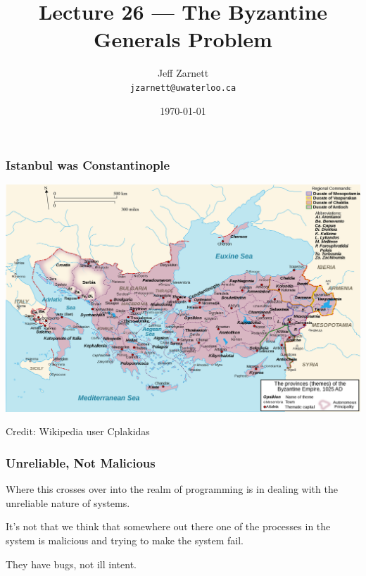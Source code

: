 

\title{Lecture 26 --- The Byzantine Generals Problem }

\author{Jeff Zarnett \\ \small \texttt{jzarnett@uwaterloo.ca}}
\date{\today}




\begin{frame}
	\titlepage

\end{frame}


\begin{frame}
	\frametitle{Istanbul was Constantinople}

	\begin{center}
		\includegraphics[width=\textwidth]{images/byzantium}
	\end{center}

	Credit: Wikipedia user Cplakidas


\end{frame}

\begin{frame}
	\frametitle{Unreliable, Not Malicious}

	Where this crosses over into the realm of programming is in dealing with the unreliable nature of systems.

	It's not that we think that somewhere out there one of the processes in the system is malicious and trying to make the system fail.

	They have bugs, not ill intent.
\end{frame}


